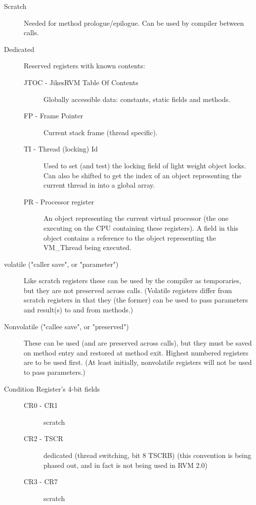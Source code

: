 \begin{description}
\item [Scratch]
     Needed for method prologue/epilogue.  Can be used by compiler between
     calls.

\item[Dedicated]
     Reserved registers with known contents:
\begin{description}
\item [JTOC - JikesRVM Table Of Contents]
        Globally accessible data: constants, static fields and methods.

\item [FP - Frame Pointer]
        Current stack frame (thread specific).

\item [TI - Thread (locking) Id]
        Used to set (and test) the locking field of light weight object
        locks.  Can also be shifted to get the index of an object
        representing the current thread in into a global array.

\item [PR - Processor register]
        An object representing the current virtual processor (the one
        executing on the CPU containing these registers).  A field in
        this object contains a reference to the object representing
        the VM\_Thread being executed.
\end{description}

\item [volatile ("caller save", or "parameter")]
     Like scratch registers these can be used by the compiler as
     temporaries, but they are not preserved across calls.  (Volatile
     registers differ from scratch registers in that they (the former)
     can be used to pass parameters and result(s) to and from
     methods.)

\item [Nonvolatile ("callee save", or "preserved")]
     These can be used (and are preserved across calls), but they must be
     saved on method entry and restored at method exit.  Highest numbered
     registers are to be used first.  (At least initially, nonvolatile
     registers will not be used to pass parameters.)

\item[Condition Register's 4-bit fields]
\begin{description}
\item    [CR0 - CR1] scratch

\item    [CR2 - TSCR] dedicated (thread switching, bit 8 TSCRB) (this
     convention is being phased out, and in fact is not being used in RVM 2.0)

\item    [CR3 - CR7] scratch
\end{description}
\end{description}


